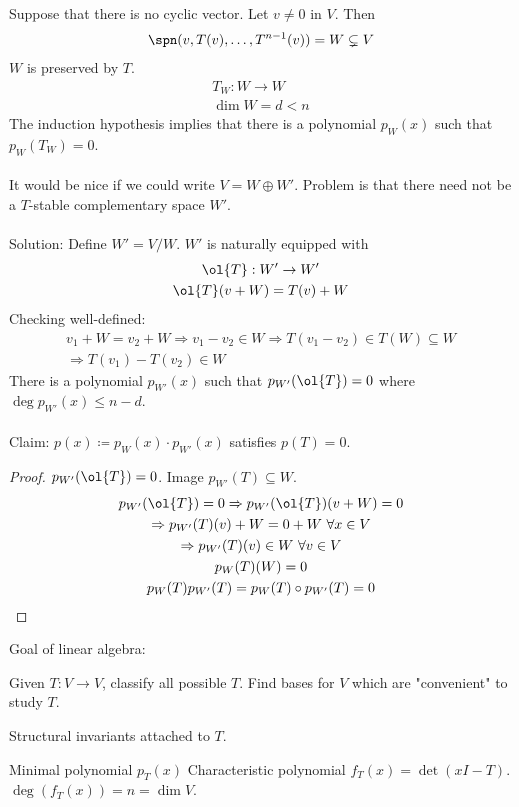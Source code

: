 \documentclass[class=scrartcl, crop=false]{standalone}
\begin{document}
Suppose that there is no cyclic vector. Let $v \neq 0$ in $V$. Then 
\begin{gather*}
  \spn(v, T(v), \dots, T^{n - 1}(v)) = W \subsetneq V
\end{gather*} 
$W$ is preserved by $T$. 
\begin{gather*}
  T_W: W \to W
  \\
  \dim W = d < n
\end{gather*} 
The induction hypothesis implies that there is a polynomial $p_W(x)$ such that $p_W(T_W) = 0$.
\\\\
It would be nice if we could write $V = W \oplus W'$. Problem is that there need not be a $T$-stable complementary space $W'$.
\\\\
Solution: Define $W' = V / W$. $W'$ is naturally equipped with
\begin{gather*}
  \ol{T}: W' \to W' \\
  \ol{T}(v + W) = T(v) + W
\end{gather*} 
Checking well-defined:
\begin{gather*}
  v_1 + W = v_2 + W \Rightarrow v_1 - v_2 \in W \Rightarrow T(v_1 - v_2) \in T(W) \subseteq W \\
  \Rightarrow T(v_1) - T(v_2) \in W
\end{gather*} 
There is a polynomial $p_{W'}(x)$ such that $p_{W'}(\ol{T}) = 0$ where $\deg p_{W'}(x) \leq n - d$.
\\\\
Claim: $p(x) \coloneqq p_W(x) \cdot p_{W'}(x)$ satisfies  $p(T) = 0$.
\begin{proof}
  $p_{W'}(\ol{T}) = 0$. Image $p_{W'}(T) \subseteq W$.
  \begin{gather*}
    p_{W'}(\ol{T}) = 0 \Rightarrow p_{W'}(\ol{T})(v + W) = 0 \\
    \Rightarrow
    p_{W'}(T)(v) + W = 0 + W \ \forall x \in V \\
    \Rightarrow p_{W'}(T)(v) \in W \ \forall v \in V \\
    p_W(T)(W) = 0 \\
    p_W(T)p_{W'}(T) = p_W(T) \circ p_{W'}(T) = 0
  \end{gather*} 
\end{proof} 


Goal of linear algebra:
\begin{enumerate}
  \ii
  Given $T: V \to V$, classify all possible $T$.
  \ii
  Find bases for $V$ which are "convenient" to study $T$.
\end{enumerate} 
Structural invariants attached to $T$.
\begin{enumerate}
  \ii
  Minimal polynomial $p_T(x)$ 
  \ii
  Characteristic polynomial $f_T(x) = \det(xI - T)$. $\deg(f_T(x)) = n = \dim V$.
\end{enumerate} 
\end{document}
